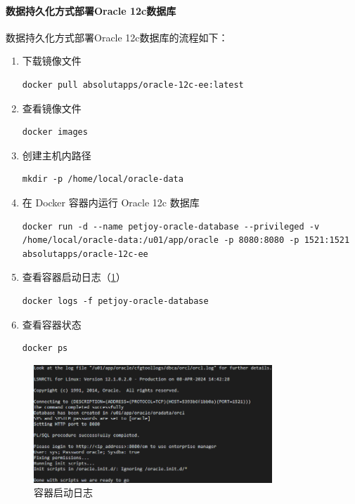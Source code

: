 \paragraph{数据持久化方式部署Oracle 12c数据库}

数据持久化方式部署Oracle 12c数据库的流程如下：

\begin{enumerate}
    \item 下载镜像文件
          \begin{verbatim}
docker pull absolutapps/oracle-12c-ee:latest
          \end{verbatim}
    \item 查看镜像文件
          \begin{verbatim}
docker images
          \end{verbatim}
    \item 创建主机内路径
          \begin{verbatim}
mkdir -p /home/local/oracle-data
          \end{verbatim}
    \item 在 Docker 容器内运行 Oracle 12c 数据库
          \begin{verbatim}
docker run -d --name petjoy-oracle-database --privileged -v /home/local/oracle-data:/u01/app/oracle -p 8080:8080 -p 1521:1521 absolutapps/oracle-12c-ee
          \end{verbatim}
    \item 查看容器启动日志（\cref{fig:ContainerStartupLog}）
          \begin{verbatim}
docker logs -f petjoy-oracle-database
          \end{verbatim}
    \item 查看容器状态
          \begin{verbatim}
docker ps
          \end{verbatim}
\end{enumerate}

\begin{figure}[htbp]
    \centering
    \includegraphics[width=0.8\textwidth]{figures/ContainerStartupLog.png}
    \caption{容器启动日志}
    \label{fig:ContainerStartupLog}
\end{figure}


